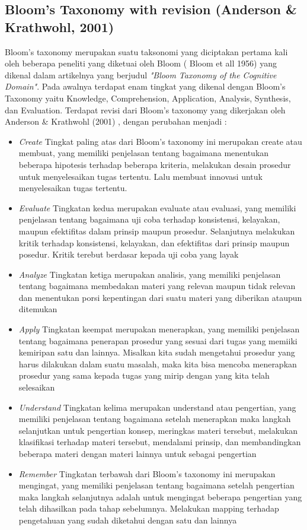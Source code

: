 	\subsection{Bloom's Taxonomy with revision (Anderson \& Krathwohl, 2001)}
	Bloom's taxonomy merupakan suatu taksonomi yang diciptakan pertama kali oleh beberapa peneliti yang diketuai oleh Bloom ( Bloom et all 1956) yang dikenal dalam artikelnya yang berjudul \textit{"Bloom Taxonomy of the Cognitive Domain"}. Pada awalnya terdapat enam tingkat yang dikenal dengan Bloom's Taxonomy yaitu Knowledge, Comprehension, Application, Analysis, Synthesis, dan Evaluation. 
	\linebreak \linebreak
	Terdapat revisi dari Bloom's taxonomy yang dikerjakan oleh Anderson \& Krathwohl (2001) , dengan perubahan menjadi :
	\begin{itemize}
		\item \textit{Create}
			\subitem Tingkat paling atas dari Bloom's taxonomy ini merupakan create atau membuat, yang memiliki penjelasan tentang bagaimana menentukan beberapa hipotesis terhadap beberapa kriteria, melakukan desain prosedur untuk menyelesaikan tugas tertentu. Lalu membuat innovasi untuk menyelesaikan tugas tertentu.
		\item \textit{Evaluate}
			\subitem Tingkatan kedua merupakan evaluate atau evaluasi, yang memiliki penjelasan tentang bagaimana uji coba terhadap konsistensi, kelayakan, maupun efektifitas dalam prinsip maupun prosedur. Selanjutnya melakukan kritik terhadap konsistensi, kelayakan, dan efektifitas dari prinsip maupun posedur. Kritik terebut berdasar kepada uji coba yang layak
		\item \textit{Analyze}
			\subitem Tingkatan ketiga merupakan analisis, yang memiliki penjelasan tentang bagaimana membedakan materi yang relevan maupun tidak relevan dan menentukan porsi kepentingan dari suatu materi yang diberikan ataupun ditemukan
		\item \textit{Apply}
			\subitem Tingkatan keempat merupakan menerapkan, yang memiliki penjelasan tentang bagaimana penerapan prosedur yang sesuai dari tugas yang memiiki kemiripan satu dan lainnya. Misalkan kita sudah mengetahui prosedur yang harus dilakukan dalam suatu masalah, maka kita bisa mencoba menerapkan prosedur yang sama kepada tugas yang mirip dengan yang kita telah selesaikan
		\item \textit{Understand}
			\subitem Tingkatan kelima merupakan understand atau pengertian, yang memiliki penjelasan tentang bagaimana setelah menerapkan maka langkah selanjutkan untuk pengertian konsep, meringkas materi tersebut, melakukan klasifikasi terhadap materi tersebut, mendalami prinsip, dan membandingkan beberapa materi dengan materi lainnya untuk sebagai pengertian
		\item \textit{Remember}
			\subitem Tingkatan terbawah dari Bloom's taxonomy ini merupakan mengingat, yang memiliki penjelasan tentang bagaimana setelah pengertian maka langkah selanjutnya adalah untuk mengingat beberapa pengertian yang telah dihasilkan pada tahap sebelumnya. Melakukan mapping terhadap pengetahuan yang sudah diketahui dengan satu dan lainnya
		
	\end{itemize}
